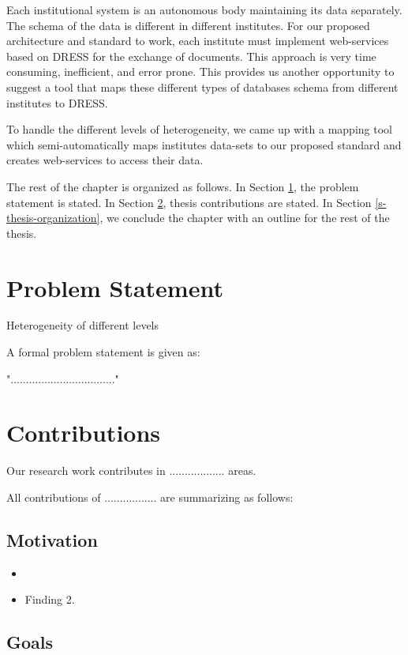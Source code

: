 \documentclass[12pt,a4paper,oneside]{book}
\begin{document}
Each institutional system is an autonomous body maintaining its data separately. The schema of the data is different in different institutes. For our proposed architecture and standard to work, each institute must  implement web-services based on DRESS for the exchange of documents. This approach is very time consuming, inefficient, and error prone. This provides us another  opportunity to suggest a tool that maps these different types of databases schema from different institutes to DRESS. 

To handle the different levels of heterogeneity, we came up with a mapping tool which semi-automatically maps institutes data-sets to our proposed standard and creates web-services to access their data.

The rest of the chapter is organized as follows. In Section \ref{s-problem_statement}, the problem statement is stated. In Section \ref{s-contributions}, thesis contributions are stated. In Section \ref{s-thesis-organization}, we conclude the chapter with an outline for the rest of the thesis.

\section{Problem Statement}\label{s-problem_statement}

Heterogeneity of different levels

A formal problem statement is given as:

".................................."

\section{Contributions}\label{s-contributions}

Our research work contributes in .................. areas.

All contributions of ................. are summarizing as follows:

\subsection{Motivation}

\begin{itemize}
\item

\item
Finding 2.
\end{itemize}

\subsection{Goals}
\end{document}
